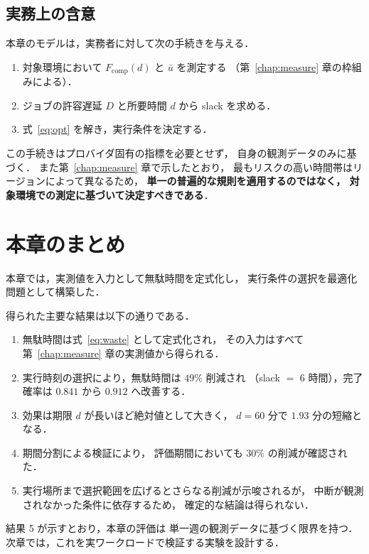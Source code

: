 \documentclass[11pt,a4paper]{ltjsreport}
\newcommand{\Fcomp}{F_{\mathrm{comp}}}
\begin{document}
\subsection{実務上の含意}

本章のモデルは，実務者に対して次の手続きを与える．

\begin{enumerate}
  \item 対象環境において $\Fcomp(d)$ と $\bar u$ を測定する
        （第~\ref{chap:measure} 章の枠組みによる）．
  \item ジョブの許容遅延 $D$ と所要時間 $d$ から slack を求める．
  \item 式~\eqref{eq:opt} を解き，実行条件を決定する．
\end{enumerate}

この手続きはプロバイダ固有の指標を必要とせず，
自身の観測データのみに基づく．
また第~\ref{chap:measure} 章で示したとおり，
最もリスクの高い時間帯はリージョンによって異なるため，
\textbf{単一の普遍的な規則を適用するのではなく，
対象環境での測定に基づいて決定すべきである}．

\section{本章のまとめ}

本章では，実測値を入力として無駄時間を定式化し，
実行条件の選択を最適化問題として構築した．

得られた主要な結果は以下の通りである．

\begin{enumerate}
  \item 無駄時間は式~\eqref{eq:waste} として定式化され，
        その入力はすべて第~\ref{chap:measure} 章の実測値から得られる．
  \item 実行時刻の選択により，無駄時間は $49\%$ 削減され
        （slack $=$ 6 時間），完了確率は $0.841$ から $0.912$ へ改善する．
  \item 効果は期限 $d$ が長いほど絶対値として大きく，
        $d = 60$ 分で $1.93$ 分の短縮となる．
  \item 期間分割による検証により，
        評価期間においても $30\%$ の削減が確認された．
  \item 実行場所まで選択範囲を広げるとさらなる削減が示唆されるが，
        中断が観測されなかった条件に依存するため，
        確定的な結論は得られない．
\end{enumerate}

結果 5 が示すとおり，本章の評価は
単一週の観測データに基づく限界を持つ．
次章では，これを実ワークロードで検証する実験を設計する．
\end{document}
